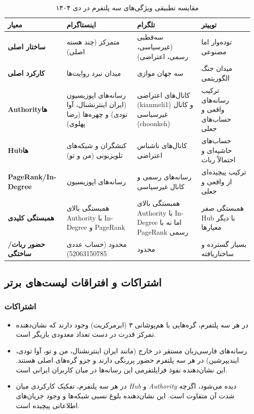 \documentclass{article}
\begin{document}
	\begin{table}[h!]
		\centering
		\caption{مقایسه تطبیقی ویژگی‌های سه پلتفرم در دی ۱۴۰۴}
		\label{tab:comparative}
		\begin{tabular}{@{}p{3cm}p{3.5cm}p{3.5cm}p{3.5cm}@{}}
			\toprule
			\textbf{معیار} & \textbf{اینستاگرام} & \textbf{تلگرام} & \textbf{توییتر} \\ \midrule
			\textbf{ساختار اصلی} & متمرکز (چند هسته اصلی) & سه‌قطبی (غیرسیاسی، رسمی، اعتراضی) & توده‌وار اما مصنوعی \\
			\textbf{کارکرد اصلی} & میدان نبرد روایت‌ها & سه جهان موازی & میدان جنگ الگوریتمی \\
			\textbf{Authorityها} & رسانه‌های اپوزیسیون (ایران اینترنشنال، آوا تودی) و چهره‌ها (رضا پهلوی) & کانال‌های اعتراضی (kianmeli1) و کانال غیرسیاسی (choonkeh) & ترکیب رسانه‌های واقعی و حساب‌های جعلی \\
			\textbf{Hubها} & کنشگران و شبکه‌های تلویزیونی (من و تو) & کانال‌های ناشناس اعتراضی & حساب‌های حاشیه‌ای و احتمالاً ربات \\
			\textbf{PageRank/In-Degree} & رسانه‌های اپوزیسیون & رسانه‌های رسمی و کانال غیرسیاسی & ترکیب پیچیده‌ای از واقعی و جعلی \\
			\textbf{همبستگی کلیدی} & همبستگی بالای Authority با In-Degree و PageRank & همبستگی بالای Authority با In-Degree اما نه با PageRank رسمی & همبستگی صفر Hub با دیگر معیارها \\
			\textbf{حضور ربات/ساختگی} & محدود (حساب عددی 52063150785) & محدود & بسیار گسترده و ساختاریافته \\ \bottomrule
		\end{tabular}
	\end{table}
	
	\subsection{اشتراکات و افتراقات لیست‌های برتر}
	
	\subsubsection*{اشتراکات}
	\begin{itemize}
		\item در هر سه پلتفرم، گره‌هایی با هم‌پوشانی ۳ (ابرمرکزیت) وجود دارند که نشان‌دهنده تمرکز قدرت در دست تعداد معدودی بازیگر است.
		\item رسانه‌های فارسی‌زبان مستقر در خارج (مانند ایران اینترنشنال، من و تو، آوا تودی، ایندیپرشین) در هر سه پلتفرم حضور پررنگی دارند و جزو گره‌های اصلی هستند. این نشان‌دهنده نفوذ فراپلتفرمی این رسانه‌ها در میان کاربران ایرانی است.
		\item در هر سه پلتفرم، تفکیک کارکردی میان \textit{Hub} و \textit{Authority} دیده می‌شود، اگرچه شدت آن متفاوت است. این نشان‌دهنده بلوغ نسبی شبکه‌ها و وجود جریان‌های اطلاعاتی پیچیده است.
	\end{itemize}
	
\end{document}
